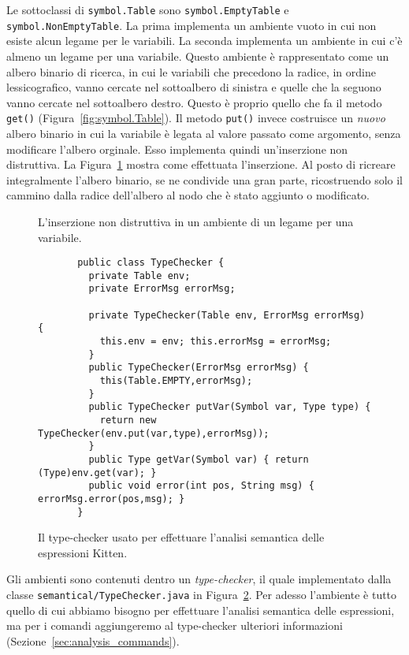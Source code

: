 Le sottoclassi di \texttt{symbol.Table} sono
\texttt{symbol.EmptyTable} e \texttt{symbol.NonEmptyTable}.
La prima implementa un ambiente vuoto in cui non esiste alcun legame
per le variabili. La seconda implementa un ambiente in cui c'\`e almeno
un legame per una variabile. Questo ambiente \`e rappresentato come
un albero binario di ricerca, in cui \cioe le variabili
che precedono la radice, in ordine lessicografico,
vanno cercate nel sottoalbero di sinistra e quelle che la seguono
vanno cercate nel sottoalbero destro. Questo \`e proprio quello che fa il
metodo \texttt{get()} (Figura~\ref{fig:symbol.Table}).
Il metodo \texttt{put()} invece costruisce
un \emph{nuovo} albero binario in cui la variabile \`e legata al valore
passato come argomento, senza modificare l'albero orginale. Esso implementa
quindi un'inserzione non distruttiva. La Figura~\ref{fig:non_destructive}
mostra come \e effettuata l'inserzione. Al posto di ricreare
integralmente l'albero binario, se ne condivide una gran parte,
ricostruendo solo il cammino dalla radice dell'albero al nodo che
\`e stato aggiunto o modificato.
%
\begin{figure}[t]
\vspace*{-33ex}
\begin{center}
\end{center}
\vspace*{-33ex}
\caption{L'inserzione non distruttiva in un ambiente di un legame per una variabile.}\label{fig:non_destructive}
\end{figure}

\begin{figure}[t]
{\small
\begin{verbatim}
       public class TypeChecker {
         private Table env;
         private ErrorMsg errorMsg;

         private TypeChecker(Table env, ErrorMsg errorMsg) {
           this.env = env; this.errorMsg = errorMsg;
         }
         public TypeChecker(ErrorMsg errorMsg) {
           this(Table.EMPTY,errorMsg);
         }
         public TypeChecker putVar(Symbol var, Type type) {
           return new TypeChecker(env.put(var,type),errorMsg));
         }
         public Type getVar(Symbol var) { return (Type)env.get(var); }
         public void error(int pos, String msg) { errorMsg.error(pos,msg); }
       }
\end{verbatim}
}
\caption{Il type-checker usato per effettuare l'analisi semantica delle espressioni Kitten.}
  \label{fig:semantical.TypeChecker1}
\end{figure}
%
Gli ambienti sono contenuti dentro un \emph{type-checker}, il quale
\e implementato dalla classe \texttt{semantical/TypeChecker.java}
in Figura~\ref{fig:semantical.TypeChecker1}.
Per adesso l'ambiente \`e tutto quello di cui abbiamo bisogno per
effettuare l'analisi semantica delle espressioni,
ma per i comandi aggiungeremo al type-checker ulteriori informazioni
(Sezione~\ref{sec:analysis_commands}).

